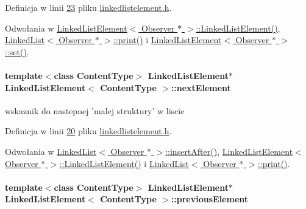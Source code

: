 Definicja w linii \hyperlink{linkedlistelement_8h_source_l00023}{23} pliku \hyperlink{linkedlistelement_8h_source}{linkedlistelement.\-h}.



Odwołania w \hyperlink{linkedlistelement_8h_source_l00036}{Linked\-List\-Element$<$ Observer $\ast$ $>$\-::\-Linked\-List\-Element()}, \hyperlink{linkedlist_8h_source_l00144}{Linked\-List$<$ Observer $\ast$ $>$\-::print()} i \hyperlink{linkedlistelement_8h_source_l00057}{Linked\-List\-Element$<$ Observer $\ast$ $>$\-::set()}.

\hypertarget{class_linked_list_element_a9bc684b1abc227f3a64a2836193e67c6}{
\paragraph[{next\-Element}]{\setlength{\rightskip}{0pt plus 5cm}template$<$class Content\-Type$>$ {\bf Linked\-List\-Element}$\ast$ {\bf Linked\-List\-Element}$<$ Content\-Type $>$\-::next\-Element}}\label{class_linked_list_element_a9bc684b1abc227f3a64a2836193e67c6}
wskaznik do nastepnej 'malej struktury' w liscie 

Definicja w linii \hyperlink{linkedlistelement_8h_source_l00020}{20} pliku \hyperlink{linkedlistelement_8h_source}{linkedlistelement.\-h}.



Odwołania w \hyperlink{linkedlist_8h_source_l00238}{Linked\-List$<$ Observer $\ast$ $>$\-::insert\-After()}, \hyperlink{linkedlistelement_8h_source_l00027}{Linked\-List\-Element$<$ Observer $\ast$ $>$\-::\-Linked\-List\-Element()} i \hyperlink{linkedlist_8h_source_l00144}{Linked\-List$<$ Observer $\ast$ $>$\-::print()}.

\hypertarget{class_linked_list_element_a7961cbdbfbb9fadf636d1a47ad049b0c}{
\paragraph[{previous\-Element}]{\setlength{\rightskip}{0pt plus 5cm}template$<$class Content\-Type$>$ {\bf Linked\-List\-Element}$\ast$ {\bf Linked\-List\-Element}$<$ Content\-Type $>$\-::previous\-Element}}\label{class_linked_list_element_a7961cbdbfbb9fadf636d1a47ad049b0c}


